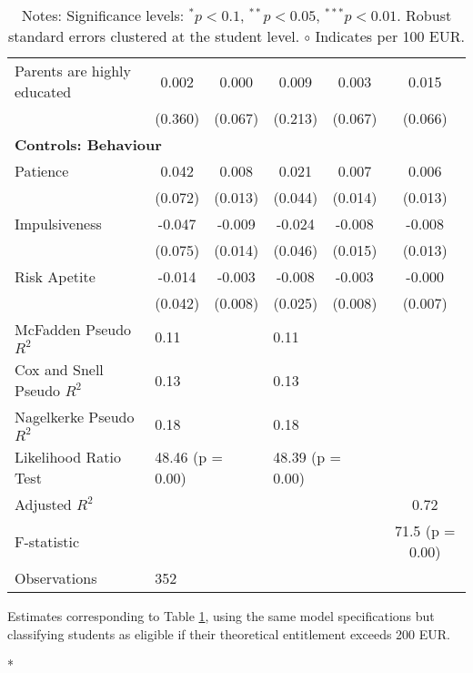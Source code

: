 \begin{table}
\begin{tabular}{lccccc}
Parents are highly educated & 0.002 & 0.000 & 0.009 & 0.003 & 0.015 \\
 & (0.360) & (0.067) & (0.213) & (0.067) & (0.066) \\
\midrule
\multicolumn{6}{l}{\textbf{Controls: Behaviour}} \\
Patience & 0.042 & 0.008 & 0.021 & 0.007 & 0.006 \\
 & (0.072) & (0.013) & (0.044) & (0.014) & (0.013) \\
Impulsiveness & -0.047 & -0.009 & -0.024 & -0.008 & -0.008 \\
 & (0.075) & (0.014) & (0.046) & (0.015) & (0.013) \\
Risk Apetite & -0.014 & -0.003 & -0.008 & -0.003 & -0.000 \\
 & (0.042) & (0.008) & (0.025) & (0.008) & (0.007) \\
\midrule
McFadden Pseudo $R^2$ & \multicolumn{2}{l}{0.11} & \multicolumn{2}{l}{0.11} & \\
Cox and Snell Pseudo $R^2$ & \multicolumn{2}{l}{0.13} & \multicolumn{2}{l}{0.13} & \\
Nagelkerke Pseudo $R^2$ & \multicolumn{2}{l}{0.18} & \multicolumn{2}{l}{0.18} & \\
Likelihood Ratio Test & \multicolumn{2}{l}{48.46 (p = 0.00)} & \multicolumn{2}{l}{48.39 (p = 0.00)} & \\
Adjusted $R^2$ & & & & & 0.72 \\
F-statistic & & & & & 71.5 (p = 0.00) \\
Observations & \multicolumn{5}{l}{352} \\
\bottomrule
\end{tabular}
\caption{Estimates corresponding to Table \ref{tab:logit_probit_lpm_results_200}, using the same model specifications but classifying students as eligible if their theoretical entitlement exceeds 200 EUR.}*
\label{tab:logit_probit_lpm_results_200}
\caption*{\small{Notes: Significance levels: $^{{*}} p < 0.1$, $^{{**}} p < 0.05$, $^{{***}} p < 0.01$. Robust standard errors clustered at the student level. $\circ$ Indicates per 100 EUR.}}
\end{table}
